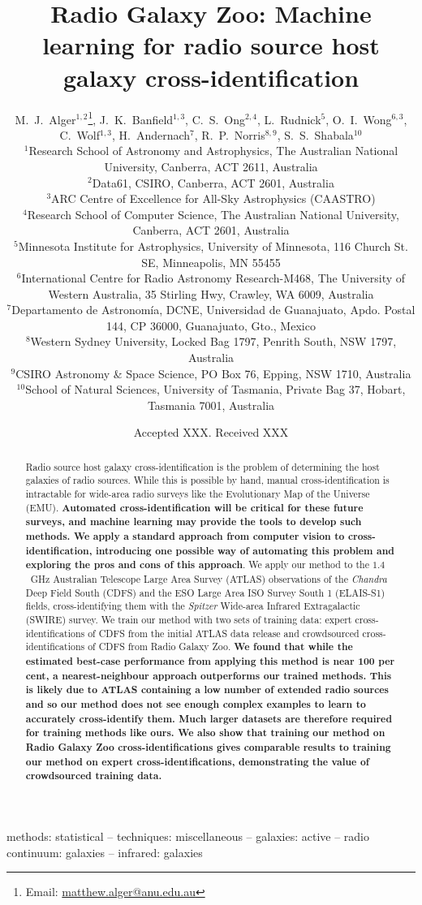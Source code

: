 \documentclass[fleqn,usenatbib,usedcolumn]{mnras}
\title[Machine learning for radio cross-identification]{Radio Galaxy Zoo: Machine learning for radio source host galaxy cross-identification}
\author[Alger et al.]{M.~J.~Alger$^{1, 2}$\thanks{Email: \href{mailto:matthew.alger@anu.edu.au}{matthew.alger@anu.edu.au}},
  J.~K.~Banfield$^{1, 3}$,
  C.~S.~Ong$^{2, 4}$,
  L.~Rudnick$^{5}$,
  O.~I.~Wong$^{6, 3}$,
  C.~Wolf$^{1, 3}$,
  \newauthor
  H.~Andernach$^{7}$,
  R.~P.~Norris$^{8, 9}$,
  S.~S.~Shabala$^{10}$
\\
$^{1}$Research School of Astronomy and Astrophysics, The Australian National University, Canberra, ACT 2611, Australia\\
$^{2}$Data61, CSIRO, Canberra, ACT 2601, Australia\\
$^{3}$ARC Centre of Excellence for All-Sky Astrophysics (CAASTRO)\\
$^{4}$Research School of Computer Science, The Australian National University, Canberra, ACT 2601, Australia\\
$^{5}$Minnesota Institute for Astrophysics, University of Minnesota, 116 Church St. SE, Minneapolis, MN 55455\\
$^{6}$International Centre for Radio Astronomy Research-M468, The University of Western Australia, 35 Stirling Hwy, Crawley, WA 6009, Australia\\
$^{7}$Departamento de Astronom\'ia, DCNE, Universidad de Guanajuato, Apdo. Postal 144, CP 36000, Guanajuato, Gto., Mexico\\
$^{8}$Western Sydney University, Locked Bag 1797, Penrith South, NSW 1797, Australia\\
$^{9}$CSIRO Astronomy \& Space Science, PO Box 76, Epping, NSW 1710, Australia\\
$^{10}$School of Natural Sciences, University of Tasmania, Private Bag 37, Hobart, Tasmania 7001, Australia
}
\date{Accepted XXX. Received XXX}
\newcommand{\edited}[1]{{\bf {#1}}}
\begin{document}
\label{firstpage}
\pagerange{\pageref{firstpage}--\pageref{lastpage}}
\maketitle

\begin{abstract}
  Radio source host galaxy cross-identification is the problem of determining
  the host galaxies of radio sources. While this is possible by hand, manual
  cross-identification is intractable for wide-area radio surveys like the
  Evolutionary Map of the Universe (EMU). \edited{Automated
  cross-identification will be critical for these future surveys, and machine
  learning may provide the tools to develop such methods. We apply a standard
  approach from computer vision to cross-identification, introducing one
  possible way of automating this problem and exploring the pros and cons of
  this approach}. We apply our method to the $1.4$~GHz Australian Telescope
  Large Area Survey (ATLAS) observations of the \emph{Chandra} Deep Field
  South (CDFS) and the ESO Large Area ISO Survey South 1 (ELAIS-S1) fields,
  cross-identifying them with the \emph{Spitzer} Wide-area Infrared
  Extragalactic (SWIRE) survey. We train our method with two sets of training
  data: expert cross-identifications of CDFS from the initial ATLAS data
  release and crowdsourced cross-identifications of CDFS from Radio Galaxy
  Zoo. \edited{We found that while the estimated best-case performance from
  applying this method is near 100 per cent, a nearest-neighbour approach
  outperforms our trained methods. This is likely due to ATLAS containing a
  low number of extended radio sources and so our method does not see enough
  complex examples to learn to accurately cross-identify them. Much larger
  datasets are therefore required for training methods like ours. We also show
  that training our method on Radio Galaxy Zoo cross-identifications gives
  comparable results to training our method on expert cross-identifications,
  demonstrating the value of crowdsourced training data.}
\end{abstract}

\begin{keywords}
methods: statistical -- techniques: miscellaneous -- galaxies: active -- radio continuum: galaxies -- infrared: galaxies\\
\end{keywords}
\end{document}
